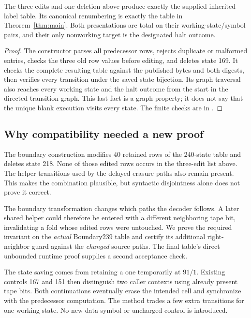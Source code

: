 \begin{proposition}
\label{prop:literal}
The three edits and one deletion above produce exactly the supplied
inherited-label table. Its canonical renumbering is exactly the table
in Theorem~\ref{thm:main}. Both presentations are total on their
working-state/symbol pairs, and their only nonworking target is the
designated halt outcome.
\end{proposition}
\begin{proof}
The constructor parses all predecessor rows, rejects duplicate or
malformed entries, checks the three old row values before editing, and
deletes state 169. It checks the complete resulting table against the
published bytes and both digests, then verifies every transition under
the saved state bijection. Its graph traversal also reaches every
working state and the halt outcome from the start in the directed
transition graph. This last fact is a graph property; it does not say
that the unique blank execution visits every state.
The finite checks are in .
\end{proof}

\subsection{Why compatibility needed a new proof}

The boundary construction modifies 40 retained rows of the 240-state
table and deletes state 218. None of those edited rows occurs in the
three-edit list above. The helper transitions used by the delayed-erasure
paths also remain present. This makes the combination plausible, but
syntactic disjointness alone does not prove it correct.

The boundary transformation changes which paths the decoder follows.
A later shared helper could therefore be entered with a different
neighboring tape bit, invalidating a fold whose edited rows were
untouched. We prove the required invariant on the \emph{actual}
Boundary239 table and certify its additional right-neighbor guard
against the \emph{changed} source paths. The final table's direct
unbounded runtime proof supplies a second acceptance check.

The state saving comes from retaining a one temporarily at $91/1$.
Existing controls 167 and 151 then distinguish two caller contexts
using already present tape bits. Both continuations eventually erase
the intended cell and synchronize with the predecessor computation.
The method trades a few extra transitions for one working state.
No new data symbol or uncharged control is introduced.

